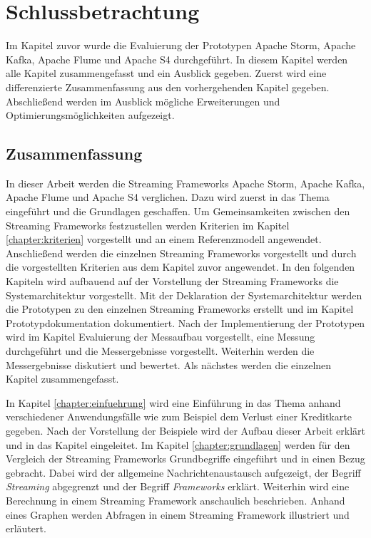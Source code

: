 \chapter{Schlussbetrachtung}
\label{sec:schlussbetrachtung}

Im Kapitel zuvor wurde die Evaluierung der Prototypen Apache Storm, Apache Kafka, Apache Flume und Apache S4 durchgeführt. In diesem Kapitel werden alle Kapitel zusammengefasst und ein Ausblick gegeben. Zuerst wird eine differenzierte Zusammenfassung aus den vorhergehenden Kapitel gegeben. Abschließend werden im Ausblick mögliche Erweiterungen und Optimierungsmöglichkeiten aufgezeigt.

\section{Zusammenfassung}

In dieser Arbeit werden die Streaming Frameworks Apache Storm, Apache Kafka, Apache Flume und Apache S4 verglichen. Dazu wird zuerst in das Thema eingeführt und die Grundlagen geschaffen. Um Gemeinsamkeiten zwischen den Streaming Frameworks festzustellen werden Kriterien im Kapitel \ref{chapter:kriterien} vorgestellt und an einem Referenzmodell angewendet. Anschließend werden
die einzelnen Streaming Frameworks vorgestellt und durch die vorgestellten Kriterien aus dem Kapitel zuvor angewendet. In den folgenden Kapiteln wird aufbauend auf der Vorstellung der Streaming Frameworks die Systemarchitektur vorgestellt. Mit der Deklaration der Systemarchitektur werden die Prototypen zu den einzelnen Streaming Frameworks erstellt und im Kapitel Prototypdokumentation dokumentiert. Nach der Implementierung der Prototypen wird im Kapitel Evaluierung der Messaufbau vorgestellt, eine Messung durchgeführt und die Messergebnisse vorgestellt. Weiterhin werden die Messergebnisse diskutiert und bewertet. Als nächstes werden die einzelnen Kapitel zusammengefasst.

In Kapitel \ref{chapter:einfuehrung} wird eine Einführung in das Thema anhand verschiedener Anwendungsfälle wie zum Beispiel dem Verlust einer Kreditkarte gegeben. Nach der Vorstellung der Beispiele wird der Aufbau dieser Arbeit erklärt und in das Kapitel  eingeleitet. Im Kapitel \ref{chapter:grundlagen} werden für den Vergleich der Streaming Frameworks Grundbegriffe eingeführt und in einen Bezug gebracht. Dabei wird der allgemeine Nachrichtenaustausch aufgezeigt, der Begriff \textit{Streaming} abgegrenzt und der Begriff \textit{Frameworks} erklärt. Weiterhin wird eine Berechnung in einem Streaming Framework anschaulich beschrieben. Anhand eines Graphen werden Abfragen in einem Streaming Framework illustriert und erläutert.

